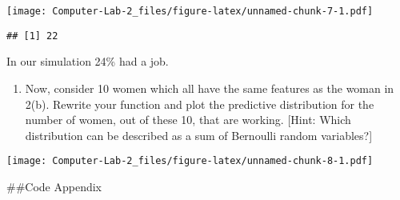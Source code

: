 \documentclass[]{article}
\providecommand{\tightlist}{%
  \setlength{\itemsep}{0pt}\setlength{\parskip}{0pt}}
\begin{document}
\texttt{[image: Computer-Lab-2\_files/figure-latex/unnamed-chunk-7-1.pdf]}

\begin{verbatim}
## [1] 22
\end{verbatim}

In our simulation 24\% had a job.

\begin{enumerate}
\def\labelenumi{(\alph{enumi})}
\setcounter{enumi}{2}
\tightlist
\item
  Now, consider 10 women which all have the same features as the woman
  in 2(b). Rewrite your function and plot the predictive distribution
  for the number of women, out of these 10, that are working. {[}Hint:
  Which distribution can be described as a sum of Bernoulli random
  variables?{]}
\end{enumerate}

\texttt{[image: Computer-Lab-2\_files/figure-latex/unnamed-chunk-8-1.pdf]}

\#\#Code Appendix
\end{document}
